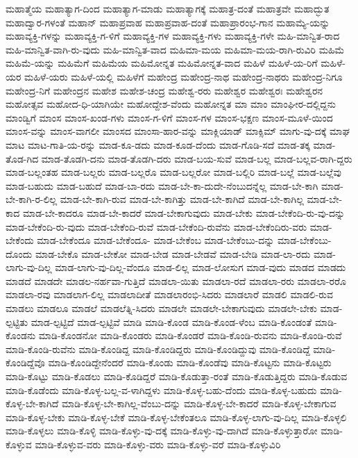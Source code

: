 {ಮಹಾತ್ಮೆಯ
ಮಹಾತ್ಯಾಗ-ದಿಂದ
ಮಹಾತ್ಯಾಗ-ಮಾಡು
ಮಹಾತ್ಯಾಗಕ್ಕೆ
ಮಹಾತ್ರ-ದಂತೆ
ಮಹಾತ್ರವೇ
ಮಹಾದ್ಭುತ
ಮಹಾದ್ವಾರ-ಗಳಂತೆ
ಮಹಾನ್
ಮಹಾಪ್ರವಾಹ
ಮಹಾಪ್ರವಾಹ-ದಂತೆ
ಮಹಾಪ್ರಾರಂಭ-ಗಾನ
ಮಹಾಮ್ಯೆ-ಯನ್ನು
ಮಹಾವ್ಯಕ್ತಿ-ಗಳನ್ನು
ಮಹಾವ್ಯಕ್ತಿ-ಗ-ಳಿಗೆ
ಮಹಾವ್ಯಕ್ತಿ-ಗಳ
ಮಹಾವ್ಯಕ್ತಿ-ಗಳು
ಮಹಾವ್ಯಕ್ತಿ-ಗಳೇ
ಮಹಿ-ಮಾನ್ವಿತ-ರಾದ
ಮಹಿ-ಮಾನ್ವಿತ-ವಾಗಿ-ರು-ವುದು
ಮಹಿ-ಮಾನ್ವಿತ-ವಾದ
ಮಹಿಮಾ-ಮಯ
ಮಹಿಮಾ-ಮಯ-ರಾಗಿ-ರುವಿರಿ
ಮಹಿಮೆ
ಮಹಿಮೆ-ಯನ್ನು
ಮಹಿಮೆಗೆ
ಮಹಿಮೆಯ
ಮಹಿಮೋನ್ನತ
ಮಹಿಮೋನ್ನತ-ವಾದ
ಮಹಿಳೆ
ಮಹಿಳೆ-ಯ-ರಿಗೆ
ಮಹಿಳೆ-ಯರ
ಮಹಿಳೆ-ಯರು
ಮಹಿಳೆ-ಯಲ್ಲಿ
ಮಹಿಳೆಗೆ
ಮಹೇಂದ್ರ
ಮಹೇಂದ್ರ-ನಾಥ
ಮಹೇಂದ್ರ-ನಾಥರು
ಮಹೇಂದ್ರ-ನಿಗೂ
ಮಹೇಂದ್ರ-ನಿಗೆ
ಮಹೇಂದ್ರನ
ಮಹೇಶ
ಮಹೇಶ-ಚಂದ್ರ
ಮಹೇಶ್ವ-ರರು
ಮಹೇಶ್ವರ
ಮಹೇಶ್ವರಃ
ಮಹೇಶ್ವರನ
ಮಹೋತ್ಸವ
ಮಹೋದ-ಧಿ-ಯಾಗಿಯೇ
ಮಹೋದ್ದೇಶ-ವೆಂದು
ಮಹೋನ್ನತ
ಮಾ
ಮಾಂ
ಮಾಂಘೀರ-ದಲ್ಲಿದ್ದನು
ಮಾಂಡ್ವಿಗೆ
ಮಾಂಸ
ಮಾಂಸ-ಖಂಡ-ಗಳು
ಮಾಂಸ-ಗ-ಳಿಗೆ
ಮಾಂಸ-ಗಳ
ಮಾಂಸ-ಭಕ್ಷಣ
ಮಾಂಸ-ಮೂಳೆ-ಯಿಂದ
ಮಾಂಸ-ವನ್ನು
ಮಾಂಸ-ವಾಗಲೀ
ಮಾಂಸದ
ಮಾಂಸಾ-ಹಾರ-ವನ್ನು
ಮಾಕ್ಲಿಯಾಡ್
ಮಾಕ್ಸಿಮ್
ಮಾಗು-ವು-ದಕ್ಕೆ
ಮಾಘ
ಮಾಟ
ಮಾಟ-ಗಾತಿ-ಯ-ರನ್ನು
ಮಾಡ-ಕೂ-ಡದು
ಮಾಡ-ಕೂಡ-ದೆಂದು
ಮಾಡ-ಗೊಡಿ-ಸದೆ
ಮಾಡ-ತಕ್ಕ
ಮಾಡ-ತೊಡ-ಗಿದ
ಮಾಡ-ತೊಡಗಿ-ದನು
ಮಾಡ-ತೊಡಗಿ-ದರು
ಮಾಡ-ಬಯ-ಸುವೆ
ಮಾಡ-ಬಲ್ಲ
ಮಾಡ-ಬಲ್ಲವ-ರಾಗಿ-ದ್ದರು
ಮಾಡ-ಬಲ್ಲಂತಹ
ಮಾಡ-ಬಲ್ಲರು
ಮಾಡ-ಬಲ್ಲರೊ
ಮಾಡ-ಬಲ್ಲರೋ
ಮಾಡ-ಬಲ್ಲಿರಿ
ಮಾಡ-ಬಲ್ಲೆ
ಮಾಡ-ಬಲ್ಲೆವು
ಮಾಡ-ಬಹುದು
ಮಾಡ-ಬಹುದೆ
ಮಾಡ-ಬಾ-ರದು
ಮಾಡ-ಬೇ-ಕಾ-ದುದೇ-ನೆಂಬುದನ್ನೆಲ್ಲ
ಮಾಡ-ಬೇ-ಕಾಗಿ
ಮಾಡ-ಬೇ-ಕಾಗಿ-ರ-ಲಿಲ್ಲ
ಮಾಡ-ಬೇ-ಕಾಗಿ-ರುವ
ಮಾಡ-ಬೇ-ಕಾಗಿತ್ತು
ಮಾಡ-ಬೇ-ಕಾಗಿದೆ
ಮಾಡ-ಬೇ-ಕಾಗಿಲ್ಲ
ಮಾಡ-ಬೇ-ಕಾದ
ಮಾಡ-ಬೇ-ಕಾದರೂ
ಮಾಡ-ಬೇ-ಕಾದರೆ
ಮಾಡ-ಬೇಕಾಗುವುದು
ಮಾಡ-ಬೇಕು
ಮಾಡ-ಬೇಕೆಂದಿ-ರು-ವು-ದನ್ನು
ಮಾಡ-ಬೇಕೆಂದಿ-ರು-ವುದು
ಮಾಡ-ಬೇಕೆಂದಿ-ರುವೆ
ಮಾಡ-ಬೇಕೆಂದಿ-ರುವೆನು
ಮಾಡ-ಬೇಕೆಂದಿರು-ವರು
ಮಾಡ-ಬೇಕೆಂದು
ಮಾಡ-ಬೇಕೆಂದೂ
ಮಾಡ-ಬೇಕೆಂದೂ-
ಮಾಡ-ಬೇಕೆಂಬ
ಮಾಡ-ಬೇಕೆಂಬು-ದನ್ನು
ಮಾಡ-ಬೇಕೆಂಬು-ದೊಂದು
ಮಾಡ-ಬೇಕೊ
ಮಾಡ-ಬೇಕೋ
ಮಾಡ-ಬೇಡ
ಮಾಡ-ಬೇಡವೆ
ಮಾಡ-ಬೇಡಿ
ಮಾಡ-ಲಾ-ರದು
ಮಾಡ-ಲಾಗು-ವು-ದಿಲ್ಲ
ಮಾಡ-ಲಾಗು-ವು-ದಿಲ್ಲ-ವೆಂದೂ
ಮಾಡ-ಲಿಲ್ಲ
ಮಾಡ-ಲೋಸುಗ
ಮಾಡ-ವುದು
ಮಾಡದ
ಮಾಡದು
ಮಾಡದೆ
ಮಾಡದೇ
ಮಾಡಲ-ನರ್ಹವಾ-ಗುತ್ತಿದೆ
ಮಾಡಲಾ-ಯಿತು
ಮಾಡಲಾ-ರದೆ
ಮಾಡಲಾ-ರರು
ಮಾಡಲಾ-ರರೊ
ಮಾಡಲಾ-ರವು
ಮಾಡಲಾಗ-ಲಿಲ್ಲ
ಮಾಡಲಾದೀತೆ
ಮಾಡಲಾರಂಭಿ-ಸಿದರು
ಮಾಡಲಾರೆ
ಮಾಡಲಿ
ಮಾಡಲಿ-ರುವ
ಮಾಡಲು
ಮಾಡಲೂ
ಮಾಡಲೆ
ಮಾಡಲೆತ್ನಿ-ಸಿದರು
ಮಾಡಲೇ
ಮಾಡಲೇ-ಬೇಕಾಗುವುದು
ಮಾಡಲೇ-ಬೇಕು
ಮಾಡ-ಲ್ಪಟ್ಟಿತು
ಮಾಡ-ಲ್ಪಟ್ಟಿದೆ
ಮಾಡ-ಲ್ಪಟ್ಟಿವೆ
ಮಾಡಿ
ಮಾಡಿ-ಕೊಂಡ
ಮಾಡಿ-ಕೊಂಡ-ಳೆಂಬ
ಮಾಡಿ-ಕೊಂಡಂತೆ
ಮಾಡಿ-ಕೊಂಡನು
ಮಾಡಿ-ಕೊಂಡನೋ
ಮಾಡಿ-ಕೊಂಡರು
ಮಾಡಿ-ಕೊಂಡರೆ
ಮಾಡಿ-ಕೊಂಡಿ-ರುವನು
ಮಾಡಿ-ಕೊಂಡಿ-ರುವೆ
ಮಾಡಿ-ಕೊಂಡಿ-ರುವೆನು
ಮಾಡಿ-ಕೊಂಡಿದ್ದ
ಮಾಡಿ-ಕೊಂಡಿದ್ದರು
ಮಾಡಿ-ಕೊಂಡಿದ್ದುವು
ಮಾಡಿ-ಕೊಂಡಿದ್ದೆ
ಮಾಡಿ-ಕೊಂಡಿದ್ದೆವೊ
ಮಾಡಿ-ಕೊಂಡಿದ್ದೇನೆಂದರೆ
ಮಾಡಿ-ಕೊಂಡು
ಮಾಡಿ-ಕೊಂಡೆವು
ಮಾಡಿ-ಕೊಟ್ಟನು
ಮಾಡಿ-ಕೊಟ್ಟರು
ಮಾಡಿ-ಕೊಟ್ಟು
ಮಾಡಿ-ಕೊಡಲು
ಮಾಡಿ-ಕೊಡಿದ್ದರೆ
ಮಾಡಿ-ಕೊಡುತ್ತಾ-ರಂತೆ
ಮಾಡಿ-ಕೊಡುತ್ತಿದ್ದರು
ಮಾಡಿ-ಕೊಡುವ
ಮಾಡಿ-ಕೊಡೆಂದು
ಮಾಡಿ-ಕೊಳ್ಳ-ಬಲ್ಲ-ವ-ಳಾಗಿದ್ದಳು
ಮಾಡಿ-ಕೊಳ್ಳ-ಬಹು-ದೆಂದು
ಮಾಡಿ-ಕೊಳ್ಳ-ಬಹುದು
ಮಾಡಿ-ಕೊಳ್ಳ-ಬೇ-ಕಾಗಿದೆ
ಮಾಡಿ-ಕೊಳ್ಳ-ಬೇ-ಕಾಗಿಲ್ಲ-ವೆಂಬು-ದನ್ನು
ಮಾಡಿ-ಕೊಳ್ಳ-ಬೇ-ಕಾದರೆ
ಮಾಡಿ-ಕೊಳ್ಳ-ಬೇಕಾಗುವ
ಮಾಡಿ-ಕೊಳ್ಳ-ಬೇಕು
ಮಾಡಿ-ಕೊಳ್ಳ-ಬೇಕೆ
ಮಾಡಿ-ಕೊಳ್ಳ-ಬೇಕೆಂತಲೂ
ಮಾಡಿ-ಕೊಳ್ಳ-ಲಾಗು-ವು-ದಿಲ್ಲ
ಮಾಡಿ-ಕೊಳ್ಳಲಿ
ಮಾಡಿ-ಕೊಳ್ಳಲು
ಮಾಡಿ-ಕೊಳ್ಳಿ
ಮಾಡಿ-ಕೊಳ್ಳು-ವು-ದಕ್ಕೆ
ಮಾಡಿ-ಕೊಳ್ಳು-ವು-ದಾಗಿದೆ
ಮಾಡಿ-ಕೊಳ್ಳುತ್ತಾರೋ
ಮಾಡಿ-ಕೊಳ್ಳುವ
ಮಾಡಿ-ಕೊಳ್ಳುವ-ವರು
ಮಾಡಿ-ಕೊಳ್ಳು-ವರು
ಮಾಡಿ-ಕೊಳ್ಳು-ವರೆ
ಮಾಡಿ-ಕೊಳ್ಳುವಿರಿ
}
